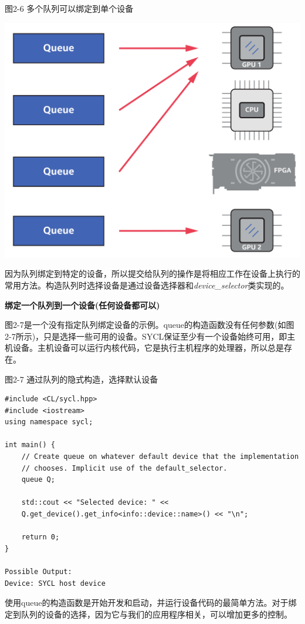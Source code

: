 \hspace*{\fill} \par %
图2-6 多个队列可以绑定到单个设备
\begin{center}
	\includegraphics[width=1.\textwidth]{content/chapter-2/images/5}
\end{center}

因为队列绑定到特定的设备，所以提交给队列的操作是将相应工作在设备上执行的常用方法。构造队列时选择设备是通过设备选择器和\textit{device\_selector}类实现的。\par

\hspace*{\fill} \par %
\textbf{绑定一个队列到一个设备(任何设备都可以)}

图2-7是一个没有指定队列绑定设备的示例。queue的构造函数没有任何参数(如图2-7所示)，只是选择一些可用的设备。SYCL保证至少有一个设备始终可用，即主机设备。主机设备可以运行内核代码，它是执行主机程序的处理器，所以总是存在。\par

\hspace*{\fill} \par %
图2-7 通过队列的隐式构造，选择默认设备
\begin{lstlisting}[caption={}]
#include <CL/sycl.hpp>
#include <iostream>
using namespace sycl;

int main() {
	// Create queue on whatever default device that the implementation
	// chooses. Implicit use of the default_selector. 
	queue Q;
	
	std::cout << "Selected device: " <<
	Q.get_device().get_info<info::device::name>() << "\n";
	
	return 0;
}

Possible Output:
Device: SYCL host device
\end{lstlisting}	

使用queue的构造函数是开始开发和启动，并运行设备代码的最简单方法。对于绑定到队列的设备的选择，因为它与我们的应用程序相关，可以增加更多的控制。\par













